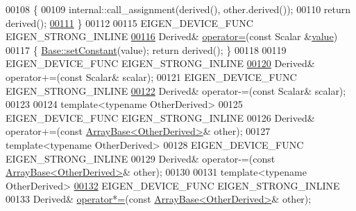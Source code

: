 \begin{DoxyCode}
00108     \{
00109       internal::call\_assignment(derived(), other.derived());
00110       \textcolor{keywordflow}{return} derived();
\hyperlink{group___core___module_a7c2e31673c2243b135e13de05de6e636}{00111}     \}
00112     
00115     EIGEN\_DEVICE\_FUNC EIGEN\_STRONG\_INLINE
\hyperlink{group___core___module_aff99276e139d767dbe3bcb360d5710a3}{00116}     Derived& \hyperlink{group___core___module_aff99276e139d767dbe3bcb360d5710a3}{operator=}(\textcolor{keyword}{const} Scalar &\hyperlink{group___core___module_a8da735a6bfc7012606acf787156d10a0}{value})
00117     \{ \hyperlink{group___core___module_a19b2bc788277e9ab3f967a8857e290ae}{Base::setConstant}(value); \textcolor{keywordflow}{return} derived(); \}
00118 
00119     EIGEN\_DEVICE\_FUNC EIGEN\_STRONG\_INLINE
\hyperlink{group___core___module_a438640146f3e7488f09a4f60c305b1d9}{00120}     Derived& operator+=(\textcolor{keyword}{const} Scalar& scalar);
00121     EIGEN\_DEVICE\_FUNC EIGEN\_STRONG\_INLINE
\hyperlink{group___core___module_a3a548f8d340cd6eeb6aed77409725d88}{00122}     Derived& operator-=(\textcolor{keyword}{const} Scalar& scalar);
00123 
00124     \textcolor{keyword}{template}<\textcolor{keyword}{typename} OtherDerived>
00125     EIGEN\_DEVICE\_FUNC EIGEN\_STRONG\_INLINE
00126     Derived& operator+=(\textcolor{keyword}{const} \hyperlink{group___core___module_class_eigen_1_1_array_base}{ArrayBase<OtherDerived>}& other);
00127     \textcolor{keyword}{template}<\textcolor{keyword}{typename} OtherDerived>
00128     EIGEN\_DEVICE\_FUNC EIGEN\_STRONG\_INLINE
00129     Derived& operator-=(\textcolor{keyword}{const} \hyperlink{group___core___module_class_eigen_1_1_array_base}{ArrayBase<OtherDerived>}& other);
00130 
00131     \textcolor{keyword}{template}<\textcolor{keyword}{typename} OtherDerived>
\hyperlink{group___core___module_a91636e129a14395905c9bd76d7141c55}{00132}     EIGEN\_DEVICE\_FUNC EIGEN\_STRONG\_INLINE
00133     Derived& \hyperlink{group___core___module_a3fc54e548f88415c3582add526b62525}{operator*=}(\textcolor{keyword}{const} \hyperlink{group___core___module_class_eigen_1_1_array_base}{ArrayBase<OtherDerived>}& other);

\end{DoxyCode}
